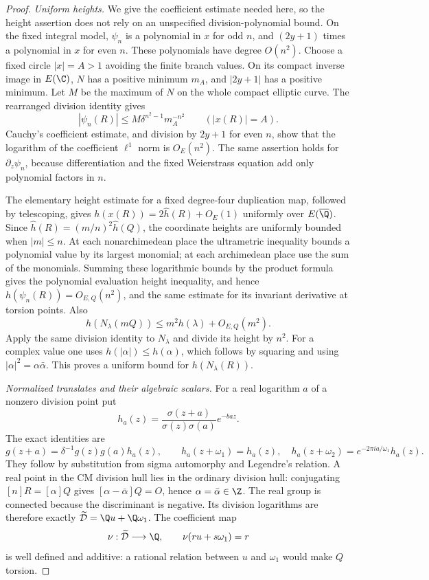 \begin{proof}
\emph{Uniform heights.}
We give the coefficient estimate needed here, so the height
assertion does not rely on an unspecified division-polynomial
bound.  On the fixed integral model, $\psi_n$ is a polynomial
in $x$ for odd $n$, and $(2y+1)$ times a polynomial in $x$
for even $n$.  These polynomials have degree $O(n^2)$.
Choose a fixed circle $|x|=A>1$ avoiding the finite branch values.
On its compact inverse image in $E(\C)$, $N$ has a positive
minimum $m_A$, and $|2y+1|$ has a positive minimum.  Let $M$
be the maximum of $N$ on the whole compact elliptic curve.
The rearranged division identity gives
\[
 |\psi_n(R)|\leq M\delta^{n^2-1}m_A^{-n^2}
       \qquad(|x(R)|=A).
\]
Cauchy's coefficient estimate, and division by $2y+1$ for
even $n$, show that the logarithm of the coefficient
$\ell^1$ norm is $O_E(n^2)$.  The same assertion holds for
$\partial_z\psi_n$, because differentiation and the fixed
Weierstrass equation add only polynomial factors in $n$.

The elementary height estimate for a fixed degree-four
duplication map, followed by telescoping, gives
$h(x(R))=2\widehat h(R)+O_E(1)$ uniformly over
$E(\overline\Q)$.  Since
$\widehat h(R)=(m/n)^2\widehat h(Q)$, the coordinate heights
are uniformly bounded when $|m|\leq n$.
At each nonarchimedean place the ultrametric inequality bounds a
polynomial value by its largest monomial; at each archimedean
place use the sum of the monomials. Summing these logarithmic
bounds by the product formula gives the polynomial evaluation
height inequality, and hence
$h(\psi_n(R))=O_{E,Q}(n^2)$, and the same estimate for its
invariant derivative at torsion points.  Also
\[
 h(N_\lambda(mQ))\leq m^2h(\lambda)+O_{E,Q}(m^2).
\]
Apply the same division identity to $N_\lambda$ and divide its height by $n^2$.
For a complex value one uses
$h(|\alpha|)\leq h(\alpha)$, which follows by squaring and
using $|\alpha|^2=\alpha\bar\alpha$.
This proves a uniform bound for $h(N_\lambda(R))$.


\emph{Normalized translates and their algebraic scalars.}
For a real logarithm $a$ of a nonzero division point put
\[
 h_a(z)=\frac{\sigma(z+a)}{\sigma(z)\sigma(a)}e^{-baz}.
\]
The exact identities are
\[
 g(z+a)=\delta^{-1}g(z)g(a)h_a(z),\qquad
 h_a(z+\omega_1)=h_a(z),\quad
 h_a(z+\omega_2)=e^{-2\pi ia/\omega_1}h_a(z).
\]
They follow by substitution from sigma automorphy and Legendre's
relation. A real point in the CM division hull lies in the
ordinary division hull: conjugating $[n]R=[\alpha]Q$ gives
$[\alpha-\bar\alpha]Q=O$, hence $\alpha=\bar\alpha\in\Z$.
The real group is connected because the discriminant is negative.
Its division logarithms are therefore exactly
$\widetilde{\mathcal D}=\Q u+\Q\omega_1$.
The coefficient map
\[
 \nu:\widetilde{\mathcal D}\longrightarrow\Q,
 \qquad \nu(ru+s\omega_1)=r
\]
is well defined and additive: a rational relation between $u$
and $\omega_1$ would make $Q$ torsion.


\end{proof}
